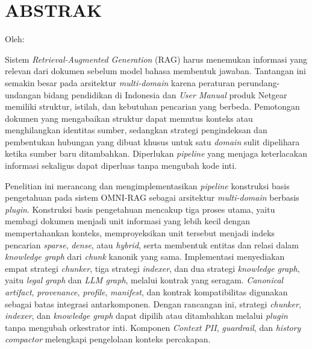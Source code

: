 \clearpage
\chapter*{ABSTRAK}

\begin{center}
    \begin{singlespace}
        {\large\bfseries \ThesisTitle}

        {\normalfont\normalsize Oleh:}

        {\bfseries \AuthorName}
    \end{singlespace}
\end{center}

\begin{singlespace}
    \small

    Sistem \emph{Retrieval-Augmented Generation} (RAG) harus menemukan informasi yang relevan dari dokumen sebelum model bahasa membentuk jawaban. Tantangan ini semakin besar pada arsitektur \emph{multi-domain} karena peraturan perundang-undangan bidang pendidikan di Indonesia dan \emph{User Manual} produk Netgear memiliki struktur, istilah, dan kebutuhan pencarian yang berbeda. Pemotongan dokumen yang mengabaikan struktur dapat memutus konteks atau menghilangkan identitas sumber, sedangkan strategi pengindeksan dan pembentukan hubungan yang dibuat khusus untuk satu \emph{domain} sulit dipelihara ketika sumber baru ditambahkan. Diperlukan \emph{pipeline} yang menjaga keterlacakan informasi sekaligus dapat diperluas tanpa mengubah kode inti.

    Penelitian ini merancang dan mengimplementasikan \emph{pipeline} konstruksi basis pengetahuan pada sistem OMNI-RAG sebagai arsitektur \emph{multi-domain} berbasis \emph{plugin}. Konstruksi basis pengetahuan mencakup tiga proses utama, yaitu membagi dokumen menjadi unit informasi yang lebih kecil dengan mempertahankan konteks, memproyeksikan unit tersebut menjadi indeks pencarian \emph{sparse}, \emph{dense}, atau \emph{hybrid}, serta membentuk entitas dan relasi dalam \emph{knowledge graph} dari \emph{chunk} kanonik yang sama. Implementasi menyediakan empat strategi \emph{chunker}, tiga strategi \emph{indexer}, dan dua strategi \emph{knowledge graph}, yaitu \emph{legal graph} dan \emph{LLM graph}, melalui kontrak yang seragam. \emph{Canonical artifact}, \emph{provenance}, \emph{profile}, \emph{manifest}, dan kontrak kompatibilitas digunakan sebagai batas integrasi antarkomponen. Dengan rancangan ini, strategi \emph{chunker}, \emph{indexer}, dan \emph{knowledge graph} dapat dipilih atau ditambahkan melalui \emph{plugin} tanpa mengubah orkestrator inti. Komponen \emph{Context PII}, \emph{guardrail}, dan \emph{history compactor} melengkapi pengelolaan konteks percakapan.


\end{singlespace}
